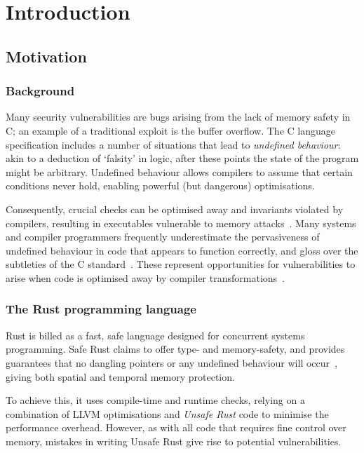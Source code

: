 \documentclass[dissertation.tex]{subfiles}
\begin{document}
\chapter{Introduction}
\label{ch:intro}

\section{Motivation}
\label{sec:intro-motiv}

\subsection{Background}
Many security vulnerabilities are bugs arising from the lack of memory
safety in C; an example of a traditional exploit is the buffer overflow.
The C language specification includes a number of situations that lead
to \emph{undefined behaviour}: akin to a deduction of `falsity' in
logic, after these points the state of the program might be arbitrary.
Undefined behaviour allows compilers to assume that certain conditions
never hold, enabling powerful (but dangerous) optimisations.

Consequently, crucial checks can be optimised away and invariants
violated by compilers, resulting in executables vulnerable to memory
attacks~\cite{simon2018wygiwyc}.
Many systems and compiler programmers frequently underestimate the
pervasiveness of undefined behaviour in code that appears to function
correctly, and gloss over the subtleties of the C
standard~\cite{memarian2016cdepths}.
These represent opportunities for vulnerabilities to arise when code is
optimised away by compiler transformations~\cite{wang2013towards}.


\subsection{The Rust programming language}

Rust is billed as a fast, safe language designed for concurrent systems
programming.
Safe Rust claims to offer type- and memory-safety, and provides
guarantees that no dangling pointers or any undefined behaviour will
occur~\cite{rust-nomicon-safe-unsafe}, giving both spatial and temporal
memory protection.

To achieve this, it uses compile-time and runtime checks, relying on a
combination of LLVM optimisations and \emph{Unsafe Rust} code to
minimise the performance overhead.
However, as with all code that requires fine control over memory,
mistakes in writing Unsafe Rust give rise to potential vulnerabilities.
\end{document}
